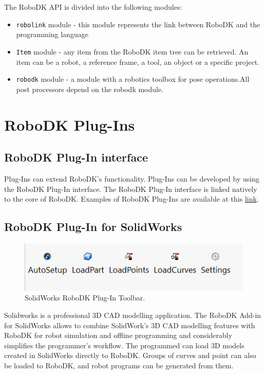 The RoboDK API is divided into the following modules:


\begin{itemize}
    \item \texttt{robolink} module - this module represents the link between RoboDK and the programming language
    \item \texttt{Item} module - any item from the RoboDK item tree can be retrieved.  An item can be a robot, a reference frame, a tool, an object or a specific project.
    \item \texttt{robodk} module - a module with a robotics toolbox for pose operations.All post processors depend on the robodk module.
\end{itemize}

\section{RoboDK Plug-Ins}

\subsection{RoboDK Plug-In interface}

Plug-Ins can extend RoboDK's functionality. Plug-Ins can be developed by using the RoboDK Plug-In interface. The RoboDK Plug-In interface is linked natively to the core of RoboDK. Examples of RoboDK Plug-Ins are available at this \href{https://github.com/RoboDK/Plug-In-Interface}{link}. 

\subsection{RoboDK Plug-In for SolidWorks}

\begin{figure}[h]
    \centering
    \includegraphics[width=0.6\linewidth]{img/solidworks_toolbar.PNG}
    \caption{SolidWorks RoboDK Plug-In Toolbar.}
    \label{fig:solidworkstoolbar}
\end{figure}


Solidworks is a professional 3D CAD modelling application. The RoboDK Add-in for SolidWorks allows to combine SolidWork's 3D CAD modelling features with RoboDK for robot simulation and offline programming and considerably simplifies the programmer's workflow. The programmed can load 3D models created in SolidWorks directly to RoboDK. Groups of curves and point can also be loaded to RoboDK, and robot programs can be generated from them.

